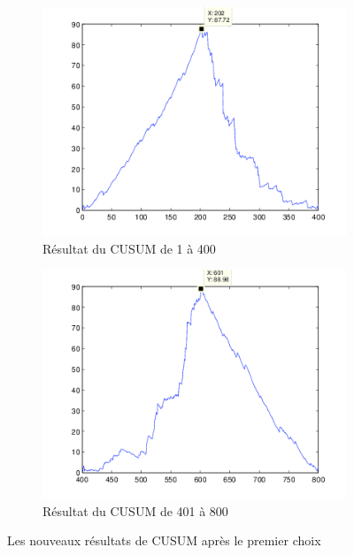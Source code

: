 \documentclass[french,11pt,notitlepage]{report}
\begin{document}
	\begin{figure}[hp]
		\begin{subfigure}[t]{.49\textwidth}
		  \includegraphics[width=\linewidth,height=.24\textheight]{mle11}
			\caption{Résultat du CUSUM de 1 à 400}
			\label{mle11}
		\end{subfigure}
		\hfill
		\begin{subfigure}[t]{.49\textwidth}
			\includegraphics[width=\linewidth,height=.24\textheight]{mle12}
			\caption{Résultat du CUSUM de 401 à 800}
			\label{mle12}
		\end{subfigure}
	\caption{Les nouveaux résultats de CUSUM après le premier choix}
	\label{testdikt2}
	\end{figure}
	
\end{document}
